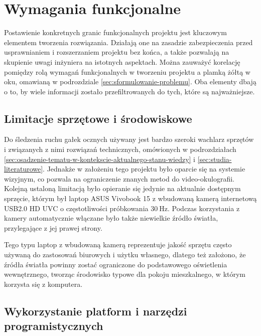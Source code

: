 \documentclass[a4paper,twoside,12pt]{book}
\begin{document}
\section{Wymagania funkcjonalne}
\label{sec:wymagania-funkcjonalne}

Postawienie konkretnych granic funkcjonalnych projektu jest kluczowym elementem tworzenia rozwiązania. Działają one na zasadzie zabezpieczenia przed usprawnianiem i rozszerzaniem projektu bez końca, a także pozwalają na skupienie uwagi inżyniera na istotnych aspektach. Można zauważyć korelację pomiędzy rolą wymagań funkcjonalnych w tworzeniu projektu a plamką żółtą w oku, omawianą w podrozdziale \ref{sec:sformulowanie-problemu}. Oba elementy dbają o to, by wiele informacji zostało przefiltrowanych do tych, które są najważniejsze.

\subsection{Limitacje sprzętowe i środowiskowe}
\label{subsec:Limitacje-sprzetowe-i-srodowiskowe}

Do śledzenia ruchu gałek ocznych używany jest bardzo szeroki wachlarz sprzętów i związanych z nimi rozwiązań technicznych, omówionych w podrozdziałach \ref{sec:osadzenie-tematu-w-kontekscie-aktualnego-stanu-wiedzy} i \ref{sec:studia-literaturowe}. Jednakże w założeniu tego projektu było oparcie się na systemie wizyjnym, co pozwala na ograniczenie znanych metod do video-okulografii. Kolejną ustaloną limitacją było opieranie się jedynie na aktualnie dostępnym sprzęcie, którym był laptop ASUS Vivobook 15 z wbudowaną kamerą internetową USB2.0 HD UVC o częstotliwości próbkowania $30 \ \unit{\hertz}$. Podczas korzystania z kamery automatycznie włączane było także niewielkie źródło światła, przylegające z jej prawej strony.

Tego typu laptop z wbudowaną kamerą reprezentuje jakość sprzętu często używaną do zastosowań biurowych i użytku własnego, dlatego też założono, że źródła światła powinny zostać ograniczone do podstawowego oświetlenia wewnętrznego, tworząc środowisko typowe dla pokoju mieszkalnego, w którym korzysta się z komputera.

\subsection{Wykorzystanie platform i narzędzi programistycznych}
\label{subsec:Wykorzystanie-platform-i-narzedzi-programistycznych}
\end{document}
